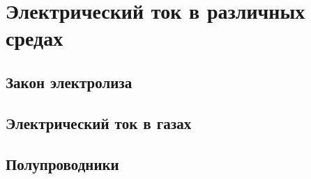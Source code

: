 \section{Электрический ток в различных средах}



\subsection{Закон электролиза}

\subsection{Электрический ток в газах}

\subsection{Полупроводники}